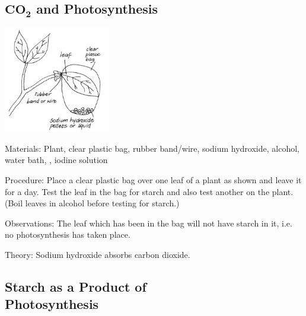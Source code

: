 \begin{multicols}{2}
\subsection{$\mathrm{\textbf{C}\textbf{O}_\textbf{2}}$ and Photosynthesis} %

\begin{center}
\includegraphics[width=0.35\textwidth]{./img/vso/co2-photo.jpg}
\end{center}

\begin{description*}
\item[Materials:]{Plant, clear plastic bag, rubber band/wire, sodium hydroxide, alcohol, water bath, , iodine solution}
\item[Procedure:]{Place a clear plastic bag over one
leaf of a plant as shown and leave
it for a day. Test the leaf in the
bag for starch and also test
another on the plant. (Boil leaves
in alcohol before testing for
starch.) }
\item[Observations:]{The leaf which has been
in the bag will not have starch in
it, i.e. no photosynthesis has
taken place.}
\item[Theory:]{Sodium hydroxide absorbs carbon dioxide.}
\end{description*}

\columnbreak

\subsection[Starch as a Product of Photosynthesis]{Starch as a Product of \hfill \\ Photosynthesis} %


\end{multicols}

